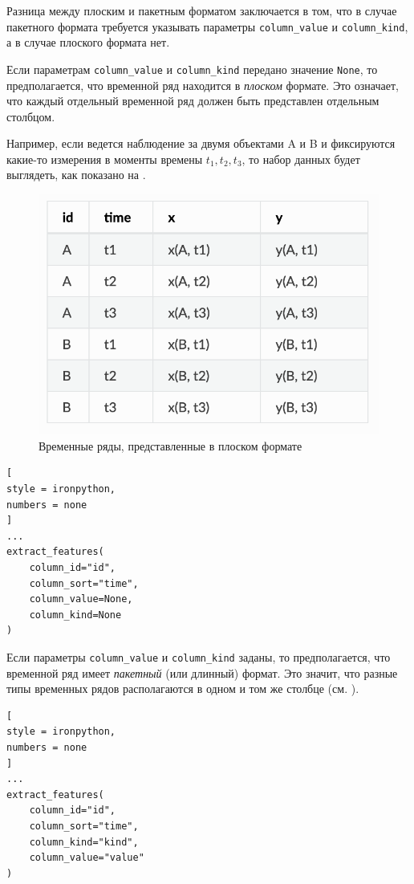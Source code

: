 \documentclass[%
	11pt,
	a4paper,
	utf8,
		]{article}
\begin{document}
Разница между плоским и пакетным форматом заключается в том, что в случае пакетного формата требуется указывать параметры \texttt{column\_value} и \texttt{column\_kind}, а в случае плоского формата нет.

Если параметрам \texttt{column\_value} и \texttt{column\_kind} передано значение \texttt{None}, то предполагается, что временной ряд находится в \emph{плоском} формате. Это означает, что каждый отдельный временной ряд должен быть представлен отдельным столбцом.

Например, если ведется наблюдение за двумя объектами A и B и фиксируются какие-то измерения в моменты времены $ t_1, t_2, t_3 $, то набор данных будет выглядеть, как показано на .

\begin{figure}[h]
	\centering
	\includegraphics[scale=0.25]{figures/flat_df_ts.png}
	\caption{ Временные ряды, представленные в плоском формате }\label{fig:flat_df_ts}
\end{figure}

\begin{lstlisting}[
style = ironpython,
numbers = none
]
...
extract_features(
    column_id="id",
    column_sort="time",
    column_value=None,
    column_kind=None
)
\end{lstlisting}

Если параметры \texttt{column\_value} и \texttt{column\_kind} заданы, то предполагается, что временной ряд имеет \emph{пакетный} (или длинный) формат. Это значит, что разные типы временных рядов располагаются в одном и том же столбце (см. ).

\begin{lstlisting}[
style = ironpython,
numbers = none	
]
...
extract_features(
    column_id="id",
    column_sort="time",
    column_kind="kind",
    column_value="value"
)
\end{lstlisting}
\end{document}
